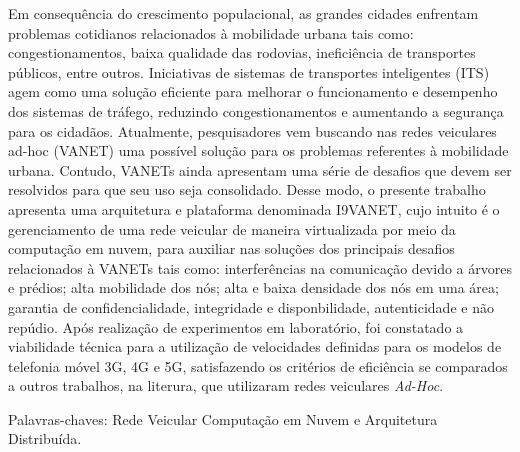 \documentclass[
	12pt,				%
	oneside,			%
	a4paper,			%
	english,			%
	brazil				%
	]{abntex2ppgsi}
\begin{document}
\begin{resumo}
Em consequência do crescimento populacional, as grandes cidades enfrentam problemas cotidianos relacionados à mobilidade urbana tais como: congestionamentos, baixa qualidade das rodovias, ineficiência de transportes públicos, entre outros. Iniciativas de sistemas de transportes inteligentes (ITS) agem como uma solução eficiente para melhorar o funcionamento e desempenho dos sistemas de tráfego, reduzindo congestionamentos e aumentando a segurança para os cidadãos. Atualmente, pesquisadores vem buscando nas redes veiculares ad-hoc (VANET) uma possível solução para os problemas referentes à mobilidade urbana. Contudo, VANETs ainda apresentam uma série de desafios que devem ser resolvidos para que seu uso seja consolidado.  Desse modo, o presente trabalho apresenta uma arquitetura e plataforma denominada I9VANET, cujo intuito é o gerenciamento de uma rede veicular de maneira virtualizada por meio da computação em nuvem, para auxiliar nas soluções dos principais desafios relacionados à VANETs tais como: interferências na comunicação devido a árvores e prédios;  alta mobilidade dos nós; alta e baixa densidade dos nós em uma área; garantia de confidencialidade, integridade e disponbilidade, autenticidade e não repúdio. Após realização de experimentos em laboratório, foi constatado a viabilidade técnica para a utilização de velocidades definidas para os modelos de telefonia móvel 3G, 4G e 5G, satisfazendo os critérios de eficiência se comparados a outros trabalhos, na literura, que utilizaram redes veiculares \textit{Ad-Hoc}.
 
Palavras-chaves: Rede Veicular Computação em Nuvem e Arquitetura Distribuída.

\end{resumo}
\end{document}
